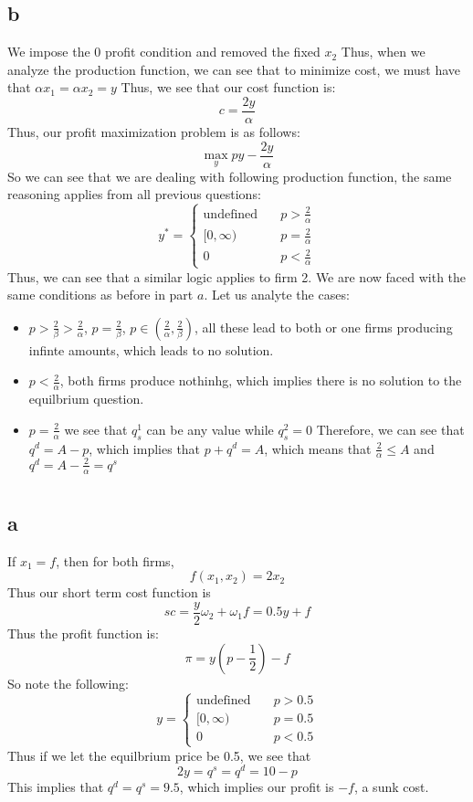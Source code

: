 \documentclass[11pt]{article}
\begin{document}
\subsection*{b}
We impose the 0 profit condition and removed the fixed $x_2$ Thus, when we analyze the production function, we can see that to minimize cost, we must have that $\alpha x_1 = \alpha x_2 = y$ Thus, we see that our cost function is:
\[
c = \frac{2y}{\alpha}
\]
Thus, our profit maximization problem is as follows:
\[
\max_y py - \frac{2y}{\alpha}
\]
So we can see that we are dealing with following production function, the same reasoning applies from all previous questions:
\[
y^* = \begin{cases}
    \text{undefined} & \quad p > \frac{2}{\alpha}\\
    [0, \infty) & \quad p = \frac{2}{\alpha}\\
    0 & \quad p < \frac{2}{\alpha}
\end{cases}
\]
Thus, we can see that a similar logic applies to firm 2. We are now faced with the same conditions as before in part $a$. Let us analyte the cases:
\begin{itemize}
    \item $p > \frac{2}{\beta} > \frac{2}{\alpha}$, $p = \frac{2}{\beta}$, $p \in (\frac{2}{\alpha}, \frac{2}{\beta})$, all these lead to both or one firms producing infinte amounts, which leads to no solution. 
    \item $p  < \frac{2}{\alpha}$, both firms produce nothinhg, which implies there is no solution to the equilbrium question. 
    \item $p = \frac{2}{\alpha}$ we see that $q^1_s$ can be any value while $q^2_s = 0$ Therefore, we can see that $q^d = A - p$, which implies that $p + q^d = A$, which means that $\frac{2}{\alpha} \leq A$ and $q^d = A - \frac{2}{\alpha} = q^s$
\end{itemize}
\section{}
\subsection*{a}
If $x_1 = f$, then for both firms, 
\[
f(x_1, x_2) = 2x_2
\]
Thus our short term cost function is 
\[
sc = \frac{y}{2} \omega_2 + \omega_1 f = 0.5y + f
\]
Thus the profit function is:
\[
\pi = y(p - \frac{1}{2}) - f
\]
So note the following:
\[
y = \begin{cases}
    \text{undefined} & \quad p > 0.5\\
    [0,\infty) & \quad p = 0.5\\
    0 & \quad p < 0.5
\end{cases}
\]
Thus  if we let the equilbrium price be 0.5, we see that 
\[
2y = q^s = q^d = 10- p
\]
This implies that $q^d = q^s = 9.5$, which implies our profit is $-f$, a sunk cost. 
\end{document}
